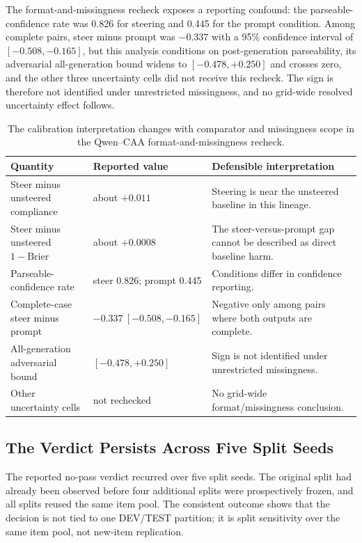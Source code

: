 \documentclass[manuscript,review,anonymous]{acmart}
\newcommand{\TopRule}{\toprule}
\begin{document}
The format-and-missingness recheck exposes a reporting confound: the parseable-confidence rate was 0.826 for steering and 0.445 for the prompt condition. {}%
Among complete pairs, steer minus prompt was \(-0.337\) with a 95\% confidence interval of \([-0.508,-0.165]\), but this analysis conditions on post-generation parseability, its adversarial all-generation bound widens to \([-0.478,+0.250]\) and crosses zero, and the other three uncertainty cells did not receive this recheck. {}%
{}%
{}%
{}%
The sign is therefore not identified under unrestricted missingness, and no grid-wide resolved uncertainty effect follows. {}%

\begin{table}[t]
\centering
\small
\caption{The calibration interpretation changes with comparator and missingness scope in the Qwen--CAA format-and-missingness recheck.}
\label{tab:calibration-scope}
\begin{tabular}{@{}p{}p{}p{}@{}}
\TopRule
Quantity & Reported value & Defensible interpretation \\
\midrule
Steer minus unsteered compliance & about $+0.011$ & Steering is near the unsteered baseline in this lineage. \\
Steer minus unsteered $1-\mathrm{Brier}$ & about $+0.0008$ & The steer-versus-prompt gap cannot be described as direct baseline harm. \\
Parseable-confidence rate & steer 0.826; prompt 0.445 & Conditions differ in confidence reporting. \\
Complete-case steer minus prompt & $-0.337\ [-0.508,-0.165]$ & Negative only among pairs where both outputs are complete. \\
All-generation adversarial bound & $[-0.478,+0.250]$ & Sign is not identified under unrestricted missingness. \\
Other uncertainty cells & not rechecked & No grid-wide format/missingness conclusion. \\
\bottomrule
\end{tabular}
\end{table}

\subsection{The Verdict Persists Across Five Split Seeds}\label{the-verdict-persists-across-five-split-seeds}

The reported no-pass verdict recurred over five split seeds. {}%
The original split had already been observed before four additional splits were prospectively frozen, and all splits reused the same item pool. {}%
The consistent outcome shows that the decision is not tied to one DEV/TEST partition; it is split sensitivity over the same item pool, not new-item replication.
\end{document}
